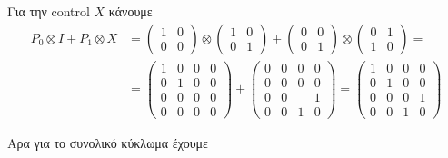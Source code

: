 \documentclass[12pt]{article}
\begin{document}
Για την \textlatin{control} $X$  κάνουμε
\begin{align*}
    P_0 \otimes I + P_1 \otimes X &=  \begin{pmatrix}
        1 & 0\\
        0 & 0
    \end{pmatrix}\otimes\begin{pmatrix}
        1 & 0\\
        0 & 1
    \end{pmatrix} + \begin{pmatrix}
        0 & 0\\
        0 & 1
    \end{pmatrix}\otimes\begin{pmatrix}
        0 &  1\\
        1 & 0
    \end{pmatrix} =\\
    &= \begin{pmatrix}
        1 & 0 & 0&0\\
        0 & 1 & 0& 0\\
        0 & 0 & 0&0\\
        0 & 0 & 0& 0
    \end{pmatrix} + \begin{pmatrix}
        0 & 0 & 0&0\\
        0 & 0 & 0& 0\\
        0 & 0 &  & 1\\
        0 & 0 & 1 & 0
    \end{pmatrix} = \begin{pmatrix}
        1 & 0 & 0&0\\
        0 & 1 & 0& 0\\
        0 & 0 & 0& 1\\
        0 & 0 & 1& 0
    \end{pmatrix} 
\end{align*}

Αρα για το συνολικό κύκλωμα έχουμε
\end{document}

